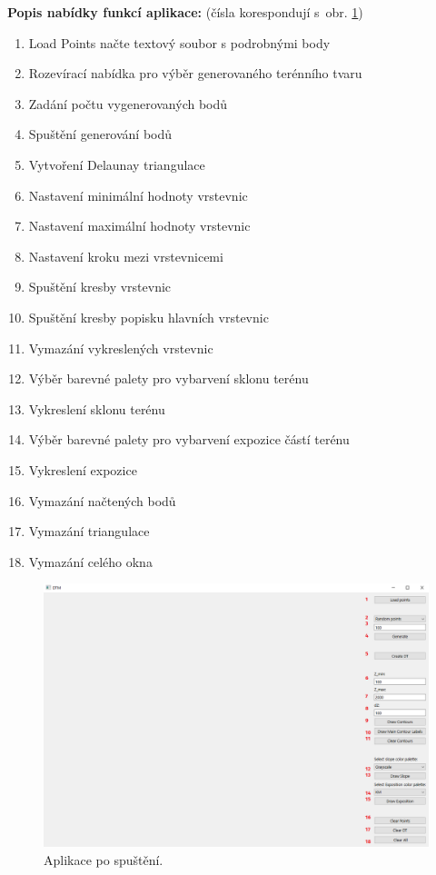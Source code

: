 \documentclass[a4paper, 12pt, oneside, titlepage]{article} %
\begin{document}
\textbf{Popis nabídky funkcí aplikace:} (čísla korespondují s~obr. \ref{fig:zapnuti})
\begin{enumerate}
\item Load Points načte textový soubor s podrobnými body
\item Rozevírací nabídka pro výběr generovaného terénního tvaru
\item Zadání počtu vygenerovaných bodů
\item Spuštění generování bodů
\item Vytvoření Delaunay triangulace
\item Nastavení minimální hodnoty vrstevnic
\item Nastavení maximální hodnoty vrstevnic
\item Nastavení kroku mezi vrstevnicemi
\item Spuštění kresby vrstevnic
\item Spuštění kresby popisku hlavních vrstevnic
\item Vymazání vykreslených vrstevnic
\item Výběr barevné palety pro vybarvení sklonu terénu
\item Vykreslení sklonu terénu
\item Výběr barevné palety pro vybarvení expozice částí terénu
\item Vykreslení expozice
\item Vymazání načtených bodů
\item Vymazání triangulace
\item Vymazání celého okna
\end{enumerate}

\begin{figure}[!htb]
	\centering
	\includegraphics[scale=0.45]{obrazky/zapnuti.png} 
	\caption{Aplikace po spuštění.
	}
	\label{fig:zapnuti}
\end{figure} 
\FloatBarrier
\end{document}
